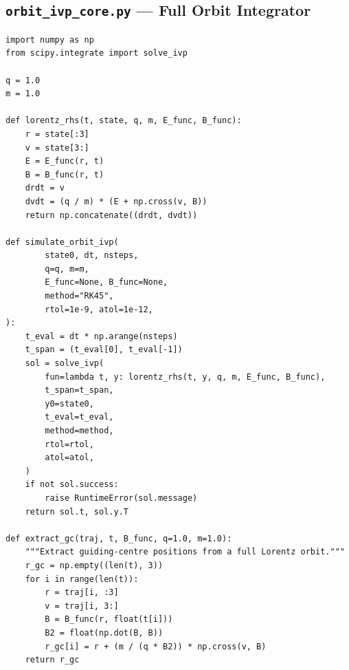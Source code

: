 \subsection{\texttt{orbit\_ivp\_core.py} --- Full Orbit Integrator}
\begin{verbatim}
import numpy as np
from scipy.integrate import solve_ivp

q = 1.0
m = 1.0

def lorentz_rhs(t, state, q, m, E_func, B_func):
    r = state[:3]
    v = state[3:]
    E = E_func(r, t)
    B = B_func(r, t)
    drdt = v
    dvdt = (q / m) * (E + np.cross(v, B))
    return np.concatenate((drdt, dvdt))

def simulate_orbit_ivp(
        state0, dt, nsteps,
        q=q, m=m,
        E_func=None, B_func=None,
        method="RK45",
        rtol=1e-9, atol=1e-12,
):
    t_eval = dt * np.arange(nsteps)
    t_span = (t_eval[0], t_eval[-1])
    sol = solve_ivp(
        fun=lambda t, y: lorentz_rhs(t, y, q, m, E_func, B_func),
        t_span=t_span,
        y0=state0,
        t_eval=t_eval,
        method=method,
        rtol=rtol,
        atol=atol,
    )
    if not sol.success:
        raise RuntimeError(sol.message)
    return sol.t, sol.y.T

def extract_gc(traj, t, B_func, q=1.0, m=1.0):
    """Extract guiding-centre positions from a full Lorentz orbit."""
    r_gc = np.empty((len(t), 3))
    for i in range(len(t)):
        r = traj[i, :3]
        v = traj[i, 3:]
        B = B_func(r, float(t[i]))
        B2 = float(np.dot(B, B))
        r_gc[i] = r + (m / (q * B2)) * np.cross(v, B)
    return r_gc
\end{verbatim}


